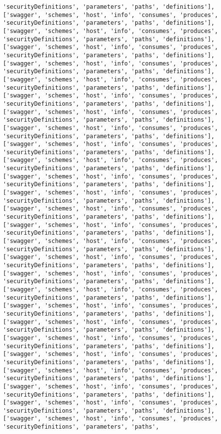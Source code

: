 \documentclass[11pt]{article}
\begin{document}
\begin{Verbatim}[commandchars=\\\{\}]
'securityDefinitions', 'parameters', 'paths', 'definitions'], ['swagger', 'schemes', 'host', 'info', 'consumes', 'produces', 'securityDefinitions', 'parameters', 'paths', 'definitions'], ['swagger', 'schemes', 'host', 'info', 'consumes', 'produces', 'securityDefinitions', 'parameters', 'paths', 'definitions'], ['swagger', 'schemes', 'host', 'info', 'consumes', 'produces', 'securityDefinitions', 'parameters', 'paths', 'definitions'], ['swagger', 'schemes', 'host', 'info', 'consumes', 'produces', 'securityDefinitions', 'parameters', 'paths', 'definitions'], ['swagger', 'schemes', 'host', 'info', 'consumes', 'produces', 'securityDefinitions', 'parameters', 'paths', 'definitions'], ['swagger', 'schemes', 'host', 'info', 'consumes', 'produces', 'securityDefinitions', 'parameters', 'paths', 'definitions'], ['swagger', 'schemes', 'host', 'info', 'consumes', 'produces', 'securityDefinitions', 'parameters', 'paths', 'definitions'], ['swagger', 'schemes', 'host', 'info', 'consumes', 'produces', 'securityDefinitions', 'parameters', 'paths', 'definitions'], ['swagger', 'schemes', 'host', 'info', 'consumes', 'produces', 'securityDefinitions', 'parameters', 'paths', 'definitions'], ['swagger', 'schemes', 'host', 'info', 'consumes', 'produces', 'securityDefinitions', 'parameters', 'paths', 'definitions'], ['swagger', 'schemes', 'host', 'info', 'consumes', 'produces', 'securityDefinitions', 'parameters', 'paths', 'definitions'], ['swagger', 'schemes', 'host', 'info', 'consumes', 'produces', 'securityDefinitions', 'parameters', 'paths', 'definitions'], ['swagger', 'schemes', 'host', 'info', 'consumes', 'produces', 'securityDefinitions', 'parameters', 'paths', 'definitions'], ['swagger', 'schemes', 'host', 'info', 'consumes', 'produces', 'securityDefinitions', 'parameters', 'paths', 'definitions'], ['swagger', 'schemes', 'host', 'info', 'consumes', 'produces', 'securityDefinitions', 'parameters', 'paths', 'definitions'], ['swagger', 'schemes', 'host', 'info', 'consumes', 'produces', 'securityDefinitions', 'parameters', 'paths', 'definitions'], ['swagger', 'schemes', 'host', 'info', 'consumes', 'produces', 'securityDefinitions', 'parameters', 'paths', 'definitions'], ['swagger', 'schemes', 'host', 'info', 'consumes', 'produces', 'securityDefinitions', 'parameters', 'paths', 'definitions'], ['swagger', 'schemes', 'host', 'info', 'consumes', 'produces', 'securityDefinitions', 'parameters', 'paths', 'definitions'], ['swagger', 'schemes', 'host', 'info', 'consumes', 'produces', 'securityDefinitions', 'parameters', 'paths', 'definitions'], ['swagger', 'schemes', 'host', 'info', 'consumes', 'produces', 'securityDefinitions', 'parameters', 'paths', 'definitions'], ['swagger', 'schemes', 'host', 'info', 'consumes', 'produces', 'securityDefinitions', 'parameters', 'paths', 'definitions'], ['swagger', 'schemes', 'host', 'info', 'consumes', 'produces', 'securityDefinitions', 'parameters', 'paths', 'definitions'], ['swagger', 'schemes', 'host', 'info', 'consumes', 'produces', 'securityDefinitions', 'parameters', 'paths', 'definitions'], ['swagger', 'schemes', 'host', 'info', 'consumes', 'produces', 'securityDefinitions', 'parameters', 'paths', 'definitions'], ['swagger', 'schemes', 'host', 'info', 'consumes', 'produces', 'securityDefinitions', 'parameters', 'paths', 
\end{Verbatim}
\end{document}
